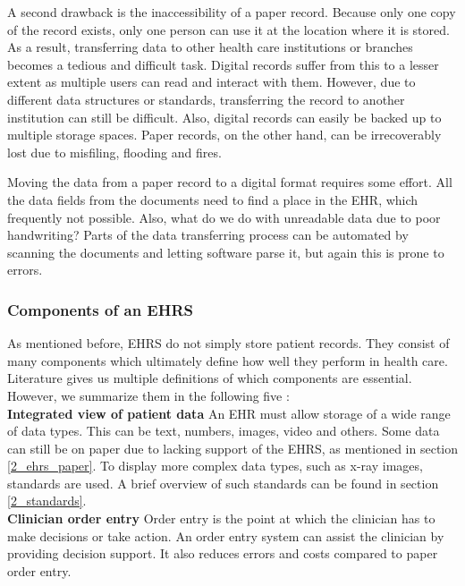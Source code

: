         A second drawback is the inaccessibility of a paper record. Because only one copy of the record exists, only one person can use it at the location where it is stored. As a result, transferring data to other health care institutions or branches becomes a tedious and difficult task. Digital records suffer from this to a lesser extent as multiple users can read and interact with them. However, due to different data structures or standards, transferring the record to another institution can still be difficult. Also, digital records can easily be backed up to multiple storage spaces. Paper records, on the other hand, can be irrecoverably lost due to misfiling, flooding and fires.

        Moving the data from a paper record to a digital format requires some effort. All the data fields from the documents need to find a place in the EHR, which frequently not possible. Also, what do we do with unreadable data due to poor handwriting? Parts of the data transferring process can be automated by scanning the documents and letting software parse it, but again this is prone to errors.

        \subsubsection{Components of an EHRS}

        As mentioned before, EHRS do not simply store patient records. They consist of many components which ultimately define how well they perform in health care. Literature gives us multiple definitions of which components are essential. However, we summarize them in the following five \cite{biomedical_informatics}:\\

        \noindent\textbf{Integrated view of patient data} An EHR must allow storage of a wide range of data types. This can be text, numbers, images, video and others. Some data can still be on paper due to lacking support of the EHRS, as mentioned in section \ref{2_ehrs_paper}. To display more complex data types, such as x-ray images, standards are used. A brief overview of such standards can be found in section \ref{2_standards}.\\

        \noindent\textbf{Clinician order entry} Order entry is the point at which the clinician has to make decisions or take action. An order entry system can assist the clinician by providing decision support. It also reduces errors and costs compared to paper order entry.\\

